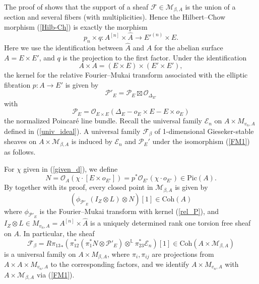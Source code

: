 \documentclass[11pt]{amsart}
\theoremstyle{plain}
\theoremstyle{definition}
\theoremstyle{remark}
\newcommand{\BL}{{\mathbb{L}}}
\newcommand{\CE}{{\mathcal E}}
\newcommand{\CF}{{\mathcal F}}
\newcommand{\CM}{{\mathcal M}}
\newcommand{\CO}{{\mathcal O}}
\newcommand{\CP}{{\mathcal P}}
\newcommand{\Coh}{\mathrm{Coh}}
\begin{document}
The proof of \cite[Theorem 3.15]{Yo} shows that the support of a sheaf $\CF \in \CM_{\beta, A}$ is the union of a section and several fibers (with multiplicities). Hence the Hilbert--Chow morphism (\ref{Hilb-Ch}) is exactly the morphism
\begin{equation}\label{HC2}
p_n\times q: A^{[n]} \times \hat{A} \to E'^{(n)} \times E.
\end{equation}
Here we use the identification between $\hat{A}$ and $A$ for the abelian surface $A= E \times E'$, and $q$ is the projection to the first factor.  Under the identification
\[
A \times A = (E \times E) \times (E'\times E'),
\]
the kernel for the relative Fourier--Mukai transform associated with the elliptic fibration $p: A \to E'$ is given by
\begin{equation}\label{rel_P}
\CP'_E = \CP_E \boxtimes \CO_{\Delta_{E'}}
\end{equation}
with
\[
\CP_E = \CO_{E\times E}(\Delta_E - o_{E}\times E - E\times o_E)
\]
the normalized Poincar\'e line bundle. Recall the universal family $\CE_n$ on $A \times M_{v_n,A}$ defined in (\ref{univ_ideal}). A universal family $\CF_\beta$ of 1-dimensional Gieseker-stable sheaves on $A \times \CM_{\beta,A}$ is induced by $\CE_n$ and $\CP_E'$ under the isomorphism (\ref{FM1}) as follows. 

For $\chi$ given in (\ref{given_d}), we define
\[
N= \CO_A\left(\chi \cdot [E\times o_{E'}]\right) = p^*\CO_{E'}(\chi \cdot o_{E'}) \in \mathrm{Pic}(A).
\]
By \cite[Theorem 3.15]{Yo} together with its proof, every closed point in $\CM_{\beta,A}$ is given by 
\[
\left(\phi_{\CP'_E}(I_Z\otimes L) \otimes N\right) [1] \in \Coh(A)
\]
where $\phi_{\CP'_E}$ is the Fourier--Mukai transform with  kernel (\ref{rel_P}), and $I_Z\otimes L \in M_{v_n,A}=A^{[n]} \times \hat{A}$  is a uniquely determined  rank one torsion free sheaf on $A$. In particular, the sheaf
\begin{equation}\label{univ2}
\CF_\beta = {R\pi_{13}}_\ast \left( \pi_{12}^\ast (\pi_1^*N\otimes{\CP'_{E}}) \otimes^{\BL} \pi_{23}^\ast \CE_n \right)[1] \in \Coh(A \times \CM_{\beta,A})
\end{equation}
is a universal family on $A \times M_{\beta,A}$, where $\pi_i, \pi_{ij}$ are projections from $A \times A \times M_{v_n,A}$ to the corresponding factors, and we identify $A \times M_{v_n,A}$ with $A \times \CM_{\beta,A}$ via (\ref{FM1}).
\end{document}
